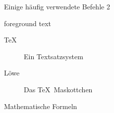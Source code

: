 \documentclass[aspectratio=169]{beamer}
\newenvironment{Shaded}{\begin{snugshade}}{\end{snugshade}}
\newcommand{\CommentTok}[1]{\textcolor[rgb]{0.57,0.57,0.57}{\textit{#1}}}
\newcommand{\ErrorTok}[1]{\textcolor[rgb]{0.93,0.31,0.35}{#1}}
\newcommand{\ExtensionTok}[1]{\textcolor[rgb]{0.25,0.67,0.19}{#1}}
\newcommand{\KeywordTok}[1]{\textcolor[rgb]{0.25,0.67,0.19}{\textbf{#1}}}
\newcommand{\NormalTok}[1]{\textcolor[rgb]{0.19,0.19,0.19}{#1}}
\newcommand{\SpecialCharTok}[1]{\textcolor[rgb]{0.50,0.36,1.00}{#1}}
\newcommand{\SpecialStringTok}[1]{\textcolor[rgb]{0.50,0.36,1.00}{#1}}
\newenvironment{Shaded}{}{}
\begin{document}
\begin{frame}[fragile]{Einige häufig verwendete Befehle 2}
\begin{minipage}{0.33\textwidth}
\begin{OutputBox}
\begin{beamercolorbox}{foreground text}
    \begin{description}
        \item[\TeX] Ein Textsatzsystem
        \item[Löwe] Das \TeX\ Maskottchen
    \end{description}

            \end{beamercolorbox}
        \end{OutputBox}
    \egroup

    \end{minipage}
    \end{frame}

    \begin{frame}[fragile]{Mathematische Formeln}
    \protect\hypertarget{mathematische-formeln}{}
    \begin{minipage}{0.66\textwidth}

\begin{Shaded}
\end{Shaded}


\end{minipage}
\end{frame}
\end{document}
